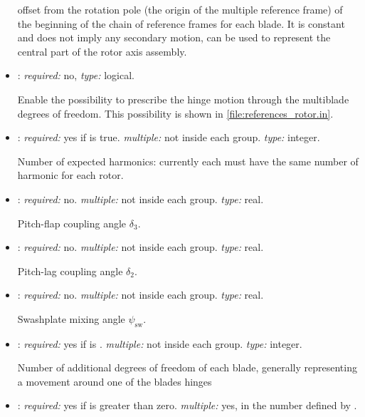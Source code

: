 \begin{itemize}
    offset from the rotation pole (the origin of the multiple reference frame) of the beginning of the chain of reference frames for each blade. It is constant and does not imply any secondary motion, can be used to represent the central part of the rotor axis assembly. 

    \item {}: \textit{required:} no, \textit{type:} logical. 
    
    Enable the possibility to prescribe the hinge motion through the multiblade degrees of freedom. 
    This possibility is shown in \ref{file:references_rotor.in}. 
    
    \item {}: \textit{required:} yes if  is true. 
    \textit{multiple:} not inside each  group. \textit{type:} integer.

    Number of expected harmonics: currently each  must have the same number of harmonic for each rotor. 
    
    \item {}: \textit{required:} no. 
    \textit{multiple:} not inside each  group. \textit{type:} real. 

    Pitch-flap coupling angle $\delta_3$. 

    \item {}: \textit{required:} no. 
    \textit{multiple:} not inside each  group. \textit{type:} real. 

    Pitch-lag coupling angle $\delta_2$. 

    \item {}: \textit{required:} no. 
    \textit{multiple:} not inside each  group. \textit{type:} real. 

    Swashplate mixing angle $\psi_\mathrm{sw}$. 

    \item {}: \textit{required:} yes if  is . 
    \textit{multiple:} not inside each  group. \textit{type:} integer.
    
    Number of additional degrees of freedom of each blade, generally representing 
    a movement around one of the blades hinges
    
    \item {}: \textit{required:} yes if  is greater than zero. 
    \textit{multiple:} yes, in the number defined by . 
    

\end{itemize}
